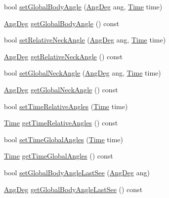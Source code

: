 \begin{DoxyCompactItemize}
\item 
bool \hyperlink{classPlayerObject_a3156d07e57edba4d4ce8645f0a91fdd3}{set\+Global\+Body\+Angle} (\hyperlink{Geometry_8h_a6bfe02ae9bb185092902092561ab2865}{Ang\+Deg} ang, \hyperlink{classTime}{Time} time)
\item 
\hyperlink{Geometry_8h_a6bfe02ae9bb185092902092561ab2865}{Ang\+Deg} \hyperlink{classPlayerObject_a8c32e163d9235c2ab0038ef738c74d22}{get\+Global\+Body\+Angle} () const 
\item 
bool \hyperlink{classPlayerObject_a09d956e2510f1572e66ec009c2172685}{set\+Relative\+Neck\+Angle} (\hyperlink{Geometry_8h_a6bfe02ae9bb185092902092561ab2865}{Ang\+Deg} ang, \hyperlink{classTime}{Time} time)
\item 
\hyperlink{Geometry_8h_a6bfe02ae9bb185092902092561ab2865}{Ang\+Deg} \hyperlink{classPlayerObject_a44cedbeb82f5a3db3f9f57855842b10d}{get\+Relative\+Neck\+Angle} () const 
\item 
bool \hyperlink{classPlayerObject_a1487d4de25978b04f1800f9483c1bb4a}{set\+Global\+Neck\+Angle} (\hyperlink{Geometry_8h_a6bfe02ae9bb185092902092561ab2865}{Ang\+Deg} ang, \hyperlink{classTime}{Time} time)
\item 
\hyperlink{Geometry_8h_a6bfe02ae9bb185092902092561ab2865}{Ang\+Deg} \hyperlink{classPlayerObject_ac7b84ff91ba81a2254313cbff5a1f180}{get\+Global\+Neck\+Angle} () const 
\item 
bool \hyperlink{classPlayerObject_a539526c5cd802b29cff3e6be04226e50}{set\+Time\+Relative\+Angles} (\hyperlink{classTime}{Time} time)
\item 
\hyperlink{classTime}{Time} \hyperlink{classPlayerObject_ac6c6455eb12ca19d41609df2a8e53a48}{get\+Time\+Relative\+Angles} () const 
\item 
bool \hyperlink{classPlayerObject_ad85554b74248deef8c12f5ab778faff0}{set\+Time\+Global\+Angles} (\hyperlink{classTime}{Time} time)
\item 
\hyperlink{classTime}{Time} \hyperlink{classPlayerObject_ac43f85956abb49ed3cc00f25fec1f791}{get\+Time\+Global\+Angles} () const 
\item 
bool \hyperlink{classPlayerObject_a4fc5e8e750666f488b8ecbb1bd40536f}{set\+Global\+Body\+Angle\+Last\+See} (\hyperlink{Geometry_8h_a6bfe02ae9bb185092902092561ab2865}{Ang\+Deg} ang)
\item 
\hyperlink{Geometry_8h_a6bfe02ae9bb185092902092561ab2865}{Ang\+Deg} \hyperlink{classPlayerObject_a724aad2574a807224bb5c353abe5a8bf}{get\+Global\+Body\+Angle\+Last\+See} () const 
\item 

\end{DoxyCompactItemize}
